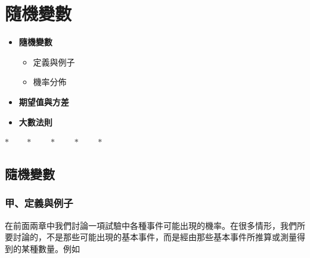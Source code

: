 \section{隨機變數}\label{sec:b5s-ch5}

\begin{center}
\begin{minipage}{0.75\textwidth}
\begin{itemize}[leftmargin=2em, itemsep=0.3em]
  \item[*§ V-1] \textbf{隨機變數}
  \begin{itemize}[leftmargin=1.5em, itemsep=0.2em]
    \item[甲、] 定義與例子
    \item[乙、] 機率分佈
  \end{itemize}
  \item[§ V-2] \textbf{期望值與方差}
  \item[*§ V-3] \textbf{大數法則}
\end{itemize}
\end{minipage}
\end{center}

\begin{center}
$* \qquad * \qquad * \qquad * \qquad *$
\end{center}

\subsection{隨機變數}\label{sec:b5s-5-1}
\setcounter{equation}{0}

\subsubsection*{甲、定義與例子}

在前面兩章中我們討論一項試驗中各種事件可能出現的機率。在很多情形，我們所要討論的，不是那些可能出現的基本事件，而是經由那些基本事件所推算或測量得到的某種數量。例如

